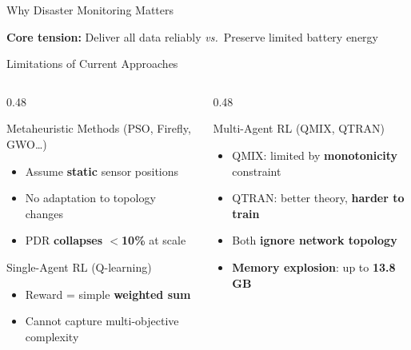 \documentclass[aspectratio=169, 11pt]{beamer}
\begin{document}
\begin{frame}{Why Disaster Monitoring Matters}
\vspace{2pt}
\centering
\colorbox{polyblue!10}{\parbox{0.9\textwidth}{\centering
  \textbf{Core tension:} Deliver all data reliably \textit{vs.}\ Preserve limited battery energy
}}

\end{frame}

\begin{frame}{Limitations of Current Approaches}

\begin{columns}[T]
\begin{column}{0.48\textwidth}

  \begin{block}{Metaheuristic Methods {\small(PSO, Firefly, GWO\ldots)}}
    \begin{itemize}\setlength{\itemsep}{1pt}
      \item[\textcolor{polyred}{\textbullet}] Assume \textbf{static} sensor positions
      \item[\textcolor{polyred}{\textbullet}] No adaptation to topology changes
      \item[\textcolor{polyred}{\textbullet}] PDR \textbf{collapses $<$10\%} at scale
    \end{itemize}
  \end{block}

  \smallskip
  \begin{block}{Single-Agent RL (Q-learning)}
    \begin{itemize}\setlength{\itemsep}{1pt}
      \item[\textcolor{polyred}{\textbullet}] Reward = simple \textbf{weighted sum}
      \item[\textcolor{polyred}{\textbullet}] Cannot capture multi-objective complexity
    \end{itemize}
  \end{block}

\end{column}
\begin{column}{0.48\textwidth}

  \begin{block}{Multi-Agent RL (QMIX, QTRAN)}
    \begin{itemize}\setlength{\itemsep}{1pt}
      \item[\textcolor{polyorange}{\textbullet}] QMIX: limited by \textbf{monotonicity} constraint
      \item[\textcolor{polyorange}{\textbullet}] QTRAN: better theory, \textbf{harder to train}
      \item[\textcolor{polyred}{\textbullet}] Both \textbf{ignore network topology}
      \item[\textcolor{polyred}{\textbullet}] \textbf{Memory explosion}: up to \textbf{13.8\,GB}
    \end{itemize}
  \end{block}


\end{column}
\end{columns}
\end{frame}
\end{document}
